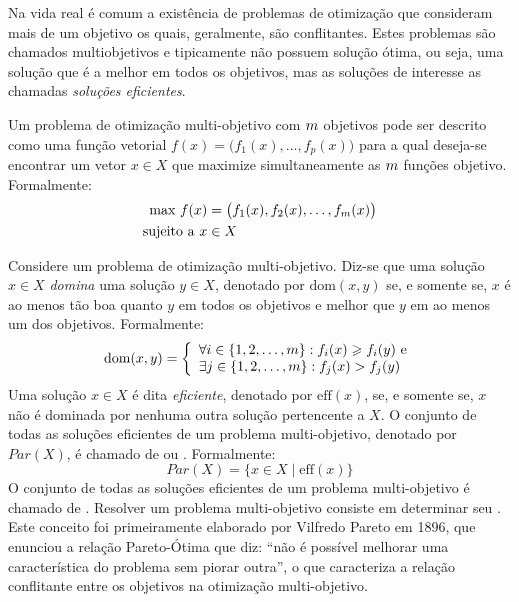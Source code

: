 

Na vida real é comum a existência de problemas de otimização que
consideram mais de um objetivo os quais, geralmente, são conflitantes.
Estes problemas são chamados multiobjetivos e tipicamente não possuem
solução ótima, ou seja, uma solução que é a melhor em todos os objetivos,
mas as soluções de interesse as chamadas \emph{soluções eficientes}.

Um problema de otimização multi-objetivo com $m$ objetivos pode ser descrito como uma
função vetorial $f(x) = \big(f_1(x), \ldots, f_p(x)\big)$
para a qual deseja-se encontrar um vetor $x \in X$
que maximize simultaneamente as $m$ funções objetivo.
Formalmente:
\begin{align*}
  \text{max} ~ f(x) &=
    \big(f_1(x)
    ,f_2(x)
    ,\ldots
    ,f_{m}(x)\big) \\
  \text{sujeito a} ~ x & \in X
\end{align*}

Considere um problema de otimização multi-objetivo.
Diz-se que uma solução $x \in X$
\emph{domina} uma solução $y \in X$, denotado por $\text{dom}(x, y)$
se, e somente se, $x$ é ao menos tão boa quanto
$y$ em todos os objetivos e melhor que $y$ em ao menos um dos objetivos.
Formalmente:
\begin{displaymath}
    \text{dom}(x, y) = \left\{
      \begin{array}{l}
          \forall i \in \{1, 2, \ldots, m\}: f_i(x) \geqslant f_i(y) ~\text{e}\\
          \exists j \in \{1, 2, \ldots, m\}: f_j(x) > f_j(y)
  \end{array} \right.
\end{displaymath}
Uma solução $x \in X$ é dita \emph{eficiente}, denotado por $\text{eff}(x)$,
se, e somente se, $x$ não é dominada por nenhuma outra solução pertencente a $X$.
O conjunto de todas as soluções eficientes de um problema multi-objetivo,
denotado por $Par(X)$, é chamado de \emph{\paretoset{}} ou \emph{\paretosetII{}}.
Formalmente:
\begin{displaymath}
  Par(X) = \{ x \in X \;|\; \text{eff}(x)\}
\end{displaymath}
O conjunto de todas as soluções eficientes de um problema multi-objetivo
é chamado de \emph{\paretoset}.
Resolver um problema multi-objetivo consiste em determinar seu \paretoset{}.
Este conceito foi primeiramente elaborado por Vilfredo Pareto em 1896, que
enunciou a relação Pareto-Ótima que diz: ``não é possível melhorar uma característica
do problema sem piorar outra'', o que caracteriza a relação conflitante entre os
objetivos na otimização multi-objetivo.

